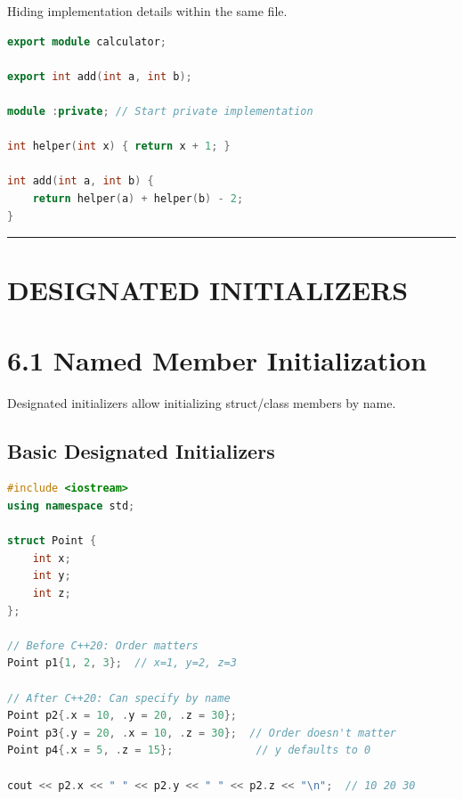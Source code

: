 Hiding implementation details within the same file.

\begin{lstlisting}[language={C++}]
export module calculator;

export int add(int a, int b);

module :private; // Start private implementation

int helper(int x) { return x + 1; }

int add(int a, int b) {
    return helper(a) + helper(b) - 2;
}
\end{lstlisting}

\begin{center}\rule{0.5\linewidth}{0.5pt}\end{center}

\hypertarget{designated-initializers}{%
\section{DESIGNATED INITIALIZERS}\label{designated-initializers}}

\hypertarget{named-member-initialization}{%
\section{6.1 Named Member
Initialization}\label{named-member-initialization}}

Designated initializers allow initializing struct/class members by name.

\hypertarget{basic-designated-initializers}{%
\subsection{Basic Designated
Initializers}\label{basic-designated-initializers}}

\begin{lstlisting}[language={C++}]
#include <iostream>
using namespace std;

struct Point {
    int x;
    int y;
    int z;
};

// Before C++20: Order matters
Point p1{1, 2, 3};  // x=1, y=2, z=3

// After C++20: Can specify by name
Point p2{.x = 10, .y = 20, .z = 30};
Point p3{.y = 20, .x = 10, .z = 30};  // Order doesn't matter
Point p4{.x = 5, .z = 15};             // y defaults to 0

cout << p2.x << " " << p2.y << " " << p2.z << "\n";  // 10 20 30
\end{lstlisting}

